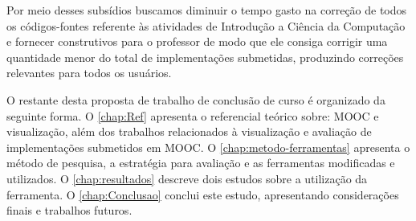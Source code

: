 	Por meio desses subsídios buscamos diminuir o tempo gasto na correção de todos os
	códigos-fontes referente às atividades de Introdução a Ciência da Computação e fornecer
	 construtivos para o professor de modo que ele consiga corrigir
	uma quantidade menor do total de implementações submetidas, produzindo correções
	relevantes para todos os usuários.
	
	O restante desta proposta de trabalho de conclusão de curso é organizado da seguinte
	forma. O \cref{chap:Ref} apresenta o referencial teórico sobre: \acs{MOOC} e visualização,
	além dos trabalhos relacionados à visualização e avaliação de implementações submetidos
	em \acs{MOOC}. O \cref{chap:metodo-ferramentas} apresenta o método de pesquisa, a estratégia
	para avaliação e as ferramentas modificadas e utilizados. O \cref{chap:resultados} descreve
	dois estudos sobre a utilização da ferramenta. O
	\cref{chap:Conclusao} conclui este estudo, apresentando considerações finais e trabalhos
	futuros.
